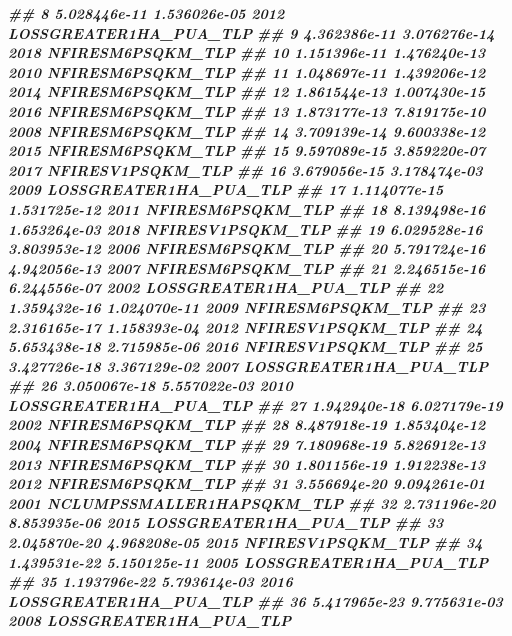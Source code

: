 \documentclass[10pt,landscape,a3paper]{article}
\newenvironment{Shaded}{\begin{snugshade}}{\end{snugshade}}
\newcommand{\DocumentationTok}[1]{\textcolor[rgb]{0.56,0.35,0.01}{\textbf{\textit{#1}}}}
\begin{document}
\begin{Shaded}
\begin{Highlighting}[]
\DocumentationTok{\#\# 8  5.028446e{-}11 1.536026e{-}05 2012     LOSSGREATER1HA\_PUA\_TLP}
\DocumentationTok{\#\# 9  4.362386e{-}11 3.076276e{-}14 2018          NFIRESM6PSQKM\_TLP}
\DocumentationTok{\#\# 10 1.151396e{-}11 1.476240e{-}13 2010          NFIRESM6PSQKM\_TLP}
\DocumentationTok{\#\# 11 1.048697e{-}11 1.439206e{-}12 2014          NFIRESM6PSQKM\_TLP}
\DocumentationTok{\#\# 12 1.861544e{-}13 1.007430e{-}15 2016          NFIRESM6PSQKM\_TLP}
\DocumentationTok{\#\# 13 1.873177e{-}13 7.819175e{-}10 2008          NFIRESM6PSQKM\_TLP}
\DocumentationTok{\#\# 14 3.709139e{-}14 9.600338e{-}12 2015          NFIRESM6PSQKM\_TLP}
\DocumentationTok{\#\# 15 9.597089e{-}15 3.859220e{-}07 2017          NFIRESV1PSQKM\_TLP}
\DocumentationTok{\#\# 16 3.679056e{-}15 3.178474e{-}03 2009     LOSSGREATER1HA\_PUA\_TLP}
\DocumentationTok{\#\# 17 1.114077e{-}15 1.531725e{-}12 2011          NFIRESM6PSQKM\_TLP}
\DocumentationTok{\#\# 18 8.139498e{-}16 1.653264e{-}03 2018          NFIRESV1PSQKM\_TLP}
\DocumentationTok{\#\# 19 6.029528e{-}16 3.803953e{-}12 2006          NFIRESM6PSQKM\_TLP}
\DocumentationTok{\#\# 20 5.791724e{-}16 4.942056e{-}13 2007          NFIRESM6PSQKM\_TLP}
\DocumentationTok{\#\# 21 2.246515e{-}16 6.244556e{-}07 2002     LOSSGREATER1HA\_PUA\_TLP}
\DocumentationTok{\#\# 22 1.359432e{-}16 1.024070e{-}11 2009          NFIRESM6PSQKM\_TLP}
\DocumentationTok{\#\# 23 2.316165e{-}17 1.158393e{-}04 2012          NFIRESV1PSQKM\_TLP}
\DocumentationTok{\#\# 24 5.653438e{-}18 2.715985e{-}06 2016          NFIRESV1PSQKM\_TLP}
\DocumentationTok{\#\# 25 3.427726e{-}18 3.367129e{-}02 2007     LOSSGREATER1HA\_PUA\_TLP}
\DocumentationTok{\#\# 26 3.050067e{-}18 5.557022e{-}03 2010     LOSSGREATER1HA\_PUA\_TLP}
\DocumentationTok{\#\# 27 1.942940e{-}18 6.027179e{-}19 2002          NFIRESM6PSQKM\_TLP}
\DocumentationTok{\#\# 28 8.487918e{-}19 1.853404e{-}12 2004          NFIRESM6PSQKM\_TLP}
\DocumentationTok{\#\# 29 7.180968e{-}19 5.826912e{-}13 2013          NFIRESM6PSQKM\_TLP}
\DocumentationTok{\#\# 30 1.801156e{-}19 1.912238e{-}13 2012          NFIRESM6PSQKM\_TLP}
\DocumentationTok{\#\# 31 3.556694e{-}20 9.094261e{-}01 2001 NCLUMPSSMALLER1HAPSQKM\_TLP}
\DocumentationTok{\#\# 32 2.731196e{-}20 8.853935e{-}06 2015     LOSSGREATER1HA\_PUA\_TLP}
\DocumentationTok{\#\# 33 2.045870e{-}20 4.968208e{-}05 2015          NFIRESV1PSQKM\_TLP}
\DocumentationTok{\#\# 34 1.439531e{-}22 5.150125e{-}11 2005     LOSSGREATER1HA\_PUA\_TLP}
\DocumentationTok{\#\# 35 1.193796e{-}22 5.793614e{-}03 2016     LOSSGREATER1HA\_PUA\_TLP}
\DocumentationTok{\#\# 36 5.417965e{-}23 9.775631e{-}03 2008     LOSSGREATER1HA\_PUA\_TLP}

\end{Highlighting}
\end{Shaded}
\end{document}
